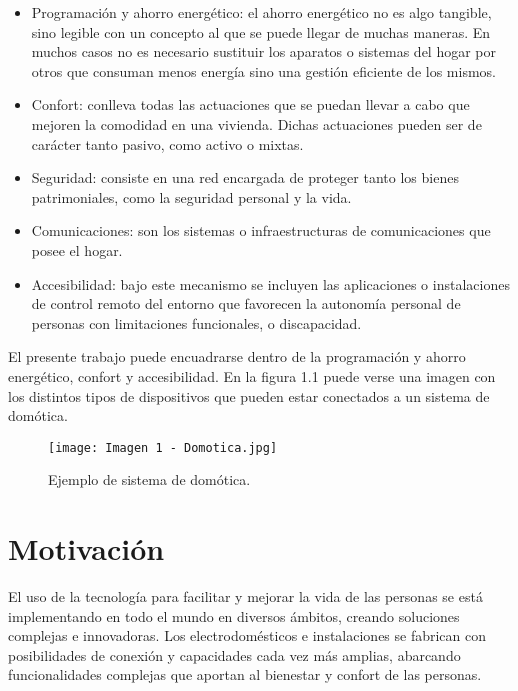 \begin{itemize}
	\item Programación y ahorro energético: el ahorro energético no es algo tangible, sino legible con un concepto al que se puede llegar de muchas maneras. En muchos casos no es necesario sustituir los aparatos o sistemas del hogar por otros que consuman menos energía sino una gestión eficiente de los mismos.
	\item Confort: conlleva todas las actuaciones que se puedan llevar a cabo que mejoren la comodidad en una vivienda. Dichas actuaciones pueden ser de carácter tanto pasivo, como activo o mixtas.
	\item Seguridad: consiste en una red encargada de proteger tanto los bienes patrimoniales, como la seguridad personal y la vida.
	\item Comunicaciones: son los sistemas o infraestructuras de comunicaciones que posee el hogar.
	\item Accesibilidad: bajo este mecanismo se incluyen las aplicaciones o instalaciones de control remoto del entorno que favorecen la autonomía personal de personas con limitaciones funcionales, o discapacidad.
\end{itemize}

El presente trabajo puede encuadrarse dentro de la programación y ahorro energético, confort y accesibilidad. En la figura 1.1 puede verse una imagen con los distintos tipos de dispositivos que pueden estar conectados a un sistema de domótica.

\begin{figure}[h]
\centering
\texttt{[image: Imagen 1 - Domotica.jpg]}
\caption[Ejemplo de sistema de domótica]{Ejemplo de sistema de domótica. \footnotemark}
\label{fig:1}
\end{figure}

\section{Motivación}

El uso de la tecnología para facilitar y mejorar la vida de las personas se está implementando en todo el mundo en diversos ámbitos, creando soluciones complejas e innovadoras. Los electrodomésticos e instalaciones se fabrican con posibilidades de conexión y capacidades cada vez más amplias, abarcando funcionalidades complejas que aportan al bienestar y confort de las personas.

